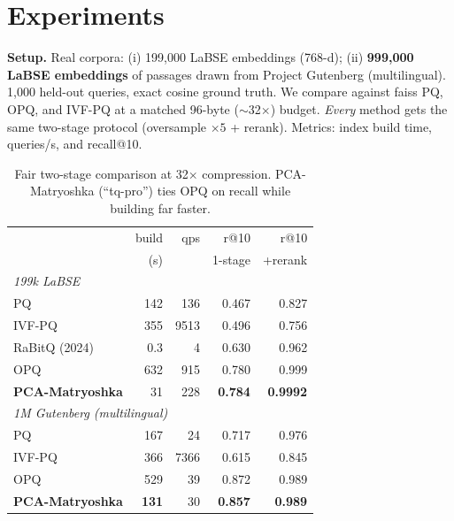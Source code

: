 \documentclass[sigconf, nonacm]{acmart}
\begin{document}
\section{Experiments}
\textbf{Setup.} Real corpora: (i) 199{,}000 LaBSE embeddings (768-d); (ii)
\textbf{999{,}000 LaBSE embeddings} of passages drawn from Project Gutenberg
(multilingual). 1{,}000 held-out queries, exact cosine ground truth. We compare
against faiss PQ, OPQ, and IVF-PQ at a matched 96-byte ($\sim$32$\times$) budget.
\emph{Every} method gets the same two-stage protocol (oversample $\times 5$ +
rerank). Metrics: index build time, queries/s, and recall@10.

\begin{table}[t]
\caption{Fair two-stage comparison at 32$\times$ compression. PCA-Matryoshka
(``tq-pro'') ties OPQ on recall while building far faster.}
\label{tab:main}
\small
\begin{tabular}{lrrrr}
\toprule
& build & qps & r@10 & r@10 \\
& (s) & & 1-stage & +rerank \\
\midrule
\multicolumn{5}{l}{\emph{199k LaBSE}} \\
\quad PQ            & 142 & 136 & 0.467 & 0.827 \\
\quad IVF-PQ        & 355 & 9513 & 0.496 & 0.756 \\
\quad RaBitQ (2024) & 0.3 & 4 & 0.630 & 0.962 \\
\quad OPQ           & 632 & 915 & 0.780 & 0.999 \\
\quad \textbf{PCA-Matryoshka} & 31 & 228 & \textbf{0.784} & \textbf{0.9992} \\
\midrule
\multicolumn{5}{l}{\emph{1M Gutenberg (multilingual)}} \\
\quad PQ            & 167 & 24 & 0.717 & 0.976 \\
\quad IVF-PQ        & 366 & 7366 & 0.615 & 0.845 \\
\quad OPQ           & 529 & 39 & 0.872 & 0.989 \\
\quad \textbf{PCA-Matryoshka} & \textbf{131} & 30 & \textbf{0.857} & \textbf{0.989} \\
\bottomrule
\end{tabular}
\end{table}
\end{document}
